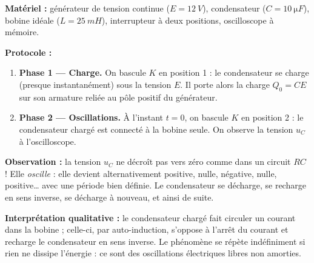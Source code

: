 \documentclass[11pt]{article}
\newcommand{\cle}[1]{{\popxbold\color{popdark}#1}}
\begin{document}
\begin{experience}
\textbf{Matériel :} générateur de tension continue ($E = \SI{12}{V}$), condensateur ($C = \SI{10}{\micro F}$), bobine idéale ($L = \SI{25}{mH}$), interrupteur à deux positions, oscilloscope à mémoire.

\textbf{Protocole :}
\begin{enumerate}
\item \textbf{Phase 1 — Charge.} On bascule $K$ en position 1 : le condensateur se charge (presque instantanément) sous la tension $E$. Il porte alors la charge $Q_0 = CE$ sur son armature reliée au pôle positif du générateur.
\item \textbf{Phase 2 — Oscillations.} À l'instant $t = 0$, on bascule $K$ en position 2 : le condensateur chargé est connecté à la bobine seule. On observe la tension $u_C$ à l'oscilloscope.
\end{enumerate}

\textbf{Observation :} la tension $u_C$ ne décroît pas vers zéro comme dans un circuit $RC$ ! Elle \emph{oscille} : elle devient alternativement positive, nulle, négative, nulle, positive\dots{} avec une période bien définie. Le condensateur se décharge, se recharge en sens inverse, se décharge à nouveau, et ainsi de suite.

\textbf{Interprétation qualitative :} le condensateur chargé fait circuler un courant dans la bobine ; celle-ci, par auto-induction, s'oppose à l'arrêt du courant et recharge le condensateur en sens inverse. Le phénomène se répète indéfiniment si rien ne dissipe l'énergie : ce sont des \cle{oscillations électriques libres non amorties}.
\end{experience}
\end{document}
